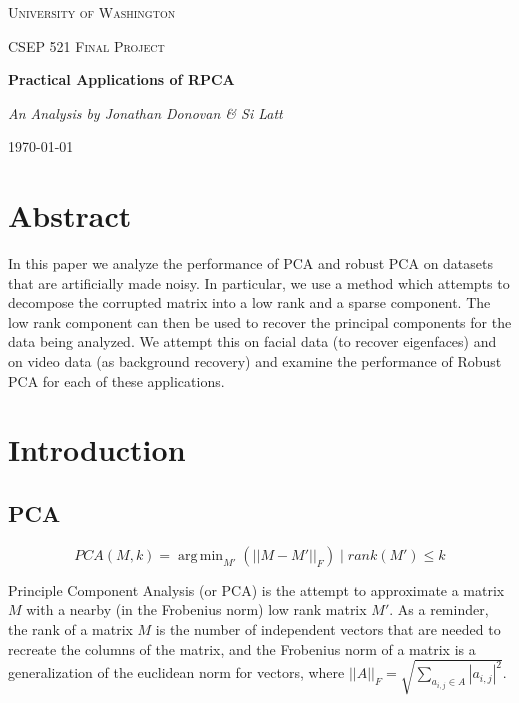 \documentclass[11pt]{scrartcl} %
\DeclareMathOperator*{\argmin}{arg\,min}
\theoremstyle{plain}
\begin{document}
\begin{titlepage}
	\centering
	{\scshape\LARGE University of Washington\par}
	\vspace{1cm}
	{\scshape\Large CSEP 521 Final Project\par}
	\vspace{1.5cm}
	{\huge\bfseries Practical Applications of RPCA\par}
	\vspace{2cm}
	{\Large\itshape  An Analysis by Jonathan Donovan \& Si Latt\par}

	\vfill

	{\large \today\par}
\end{titlepage}


\section{Abstract}
In this paper we analyze the performance of PCA and robust PCA on datasets that are artificially made noisy. In particular, we use a method\cite{pcp} which attempts to decompose the corrupted matrix into a low rank and a sparse component. The low rank component can then be used to recover the principal components for the data being analyzed. We attempt this on facial data (to recover eigenfaces) and on video data (as background recovery) and examine the performance of Robust PCA for each of these applications.

\section{Introduction}

\subsection{PCA}

\[ PCA(M, k) =\argmin_{M'}(||M-M'||_F ) \mid rank(M') \le k \]

Principle Component Analysis\cite{pca} (or PCA) is the attempt to approximate a matrix $M$ with a nearby (in the Frobenius norm) low rank matrix $M'$. As a reminder, the rank of a matrix $M$ is the number of independent vectors that are needed to recreate the columns of the matrix, and the Frobenius norm of a matrix is a generalization of the euclidean norm for vectors, where $||A||_F = \sqrt{\sum_{a_{i,j} \in A}|a_{i,j}|^2}$.
\end{document}
